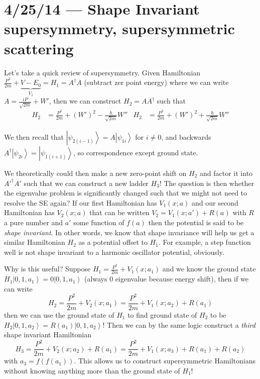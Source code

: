 \documentclass[10pt]{report}
\newcommand{\ket}[1]{\left|#1\right>}
\begin{document}
\chapter{4/25/14 --- Shape Invariant supersymmetry, supersymmetric scattering}

Let's take a quick review of supersymmetry. Given Hamiltonian $\frac{P^2}{2m} + \underbrace{V - E_0}_{V_1} = H_1 = A^\dagger A$ (subtract zer point energy) where we can write $A = \frac{iP}{\sqrt{2m}} + W'$, then we can construct $H_2 = AA^\dagger$ such that
\begin{align}
    H_2 &= \frac{P^2}{2m} + (W')^2 - \frac{\hbar}{\sqrt{2m}}W'' & H_2 &= \frac{P^2}{2m} + (W')^2 + \frac{\hbar}{\sqrt{2m}}W''
\end{align}

We then recall that $\ket{\psi_{2(i - 1)}} = A\ket{\psi_{1i}}$ for $i \neq 0$, and backwards $A^\dagger\ket{\psi_{2i}} = \ket{\psi_{1(i+1)}}$, so correspondence except ground state.

We theoretically could then make a new zero-point shift on $H_2$ and factor it into $A'^\dagger A'$ such that we can construct a new ladder $H_3$! The question is then whether the eigenvalue problem is significantly changed such that we might not need to resolve the SE again? If our first Hamiltonian has $V_1(x;a)$ and our second Hamiltonian has $V_2(x;a)$ that can be written $V_2 = V_1(x;a') + R(a)$ with $R$ a pure number and $a'$ some function of $f(a)$ then the potential is said to be \emph{shape invariant}. In other words, we know that shape invariance will help us get a similar Hamiltonian $H_2$ as a potential offset to $H_1$. For example, a step function well is not shape invariant to a harmonic oscillator potential, obviously. 

Why is this useful? Suppose $H_1= \frac{P^2}{2m} + V_1(x; a_1)$ and we know the ground state $H_1 \ket{0, 1, a_1} = 0\ket{0,1, a_1}$ (always $0$ eigenvalue because energy shift), then if we can write 
\begin{equation}
    H_2 = \frac{P^2}{2m} + V_2(x; a_1) = \frac{P^2}{2m} + V_1(x; a_2) + R(a_1)
\end{equation}
then we can use the ground state of $H_1$ to find ground state of $H_2$ to be $H_2 \ket{0,1,a_2} = R(a_1)\ket{0,1,a_2}$! Then we can by the same logic construct a \emph{third} shape invariant Hamiltonian
\begin{equation}
    H_3 = \frac{P^2}{2m} + V_2(x; a_2) + R(a_1) = \frac{P^2}{2m} + V_1(x; a_3) + R(a_1) + R(a_2)
\end{equation}
with $a_3 = f(f(a_1))$. This allows us to construct supersymmetric Hamiltonians without knowing anything more than the ground state of $H_1$!
\end{document}
